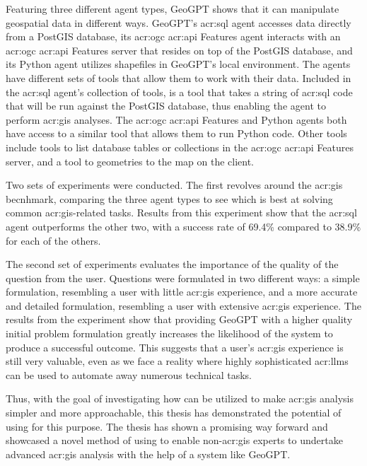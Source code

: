 Featuring three different agent types, GeoGPT shows that it can manipulate geospatial data in different ways. GeoGPT's \acrshort{acr:sql} agent accesses data directly from a PostGIS database, its \acrshort{acr:ogc} \acrshort{acr:api} Features agent interacts with an \acrshort{acr:ogc} \acrshort{acr:api} Features server that resides on top of the PostGIS database, and its Python agent utilizes shapefiles in GeoGPT's local environment. The agents have different sets of tools that allow them to work with their data. Included in the \acrshort{acr:sql} agent's collection of tools, is a tool that takes a string of \acrshort{acr:sql} code that will be run against the PostGIS database, thus enabling the agent to perform \acrshort{acr:gis} analyses. The \acrshort{acr:ogc} \acrshort{acr:api} Features and Python agents both have access to a similar tool that allows them to run Python code. Other tools include tools to list database tables or collections in the \acrshort{acr:ogc} \acrshort{acr:api} Features server, and a tool to geometries to the map on the client.


Two sets of experiments were conducted. The first revolves around the \acrshort{acr:gis} becnhmark, comparing the three agent types to see which is best at solving common \acrshort{acr:gis}-related tasks. Results from this experiment show that the \acrshort{acr:sql} agent outperforms the other two, with a success rate of 69.4\% compared to 38.9\% for each of the others.

The second set of experiments evaluates the importance of the quality of the question from the user. Questions were formulated in two different ways: a simple formulation, resembling a user with little \acrshort{acr:gis} experience, and a more accurate and detailed formulation, resembling a user with extensive \acrshort{acr:gis} experience. The results from the experiment show that providing GeoGPT with a higher quality initial problem formulation greatly increases the likelihood of the system to produce a successful outcome. This suggests that a user's \acrshort{acr:gis} experience is still very valuable, even as we face a reality where highly sophisticated \glspl{acr:llm} can be used to automate away numerous technical tasks.

Thus, with the goal of investigating how  can be utilized to make \acrshort{acr:gis} analysis simpler and more approachable, this thesis has demonstrated the potential of using  for this purpose. The thesis has shown a promising way forward and showcased a novel method of using  to enable non-\acrshort{acr:gis} experts to undertake advanced \acrshort{acr:gis} analysis with the help of a system like GeoGPT.
